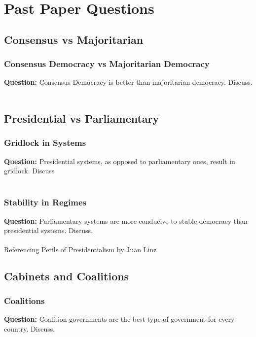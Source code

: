 \documentclass[12pt, letterpaper]{article}
\begin{document}
\newpage
\section{Past Paper Questions}

\subsection{Consensus vs Majoritarian}
\subsubsection{Consensus Democracy vs Majoritarian Democracy}
\textbf{Question:} Consensus Democracy is better than majoritarian democracy. Discuss.
\\\\



\subsection{Presidential vs Parliamentary}

\subsubsection{Gridlock in Systems}
\textbf{Question:} Presidential systems, as opposed to parliamentary ones, result in gridlock. Discuss
\\\\



\subsubsection{Stability in Regimes}
\textbf{Question:} Parliamentary systems are more conducive to stable democracy than presidential systems. Discuss.
\\\\
Referencing Perils of Presidentialism by Juan Linz

\subsection{Cabinets and Coalitions}

\subsubsection{Coalitions}
\textbf{Question:} Coalition governments are the best type of government for every country. Discuss.
\\\\
\end{document}
